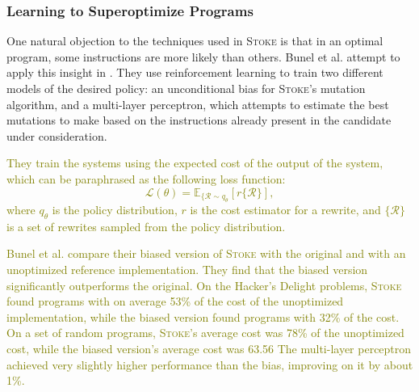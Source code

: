 \documentclass[12pt,twoside]{reedthesis}
\newcommand{\green}[1]{\textcolor{olive}{#1}}
\begin{document}
    \subsubsection{Learning to Superoptimize Programs}
        One natural objection to the techniques used in \textsc{Stoke} is that in an optimal program, some instructions are more likely than others.
        Bunel et al. attempt to apply this insight in \cite{bunel2017learning}.
        They use reinforcement learning to train two different models of the desired policy:
            an unconditional bias for \textsc{Stoke}'s mutation algorithm,
            and a multi-layer perceptron\footnotemark,
                which attempts to estimate the best mutations to make based on the instructions already present in the candidate under consideration.
        
        \green{
        They train the systems using the expected cost of the output of the system, which can be paraphrased as the following loss function:
        \[
            \mathcal{L}(\theta) = \mathbb{E}_{\{\mathcal{R}\sim q_\theta}[r\{\mathcal{R}\}],
        \]
        where $q_\theta$ is the policy distribution, $r$ is the cost estimator for a rewrite, and $\{\mathcal{R}\}$ is a set of rewrites sampled from the policy distribution.
        }
        
        \green{
        Bunel et al. compare their biased version of \textsc{Stoke} with the original and with an unoptimized reference implementation.
        They find that the biased version significantly outperforms the original.
        On the Hacker's Delight problems, \textsc{Stoke} found programs with on average 53\% of the cost of the unoptimized implementation, while the biased version found programs with 32\% of the cost.
        On a set of random programs, \textsc{Stoke}'s average cost was 78\% of the unoptimized cost, while the biased version's average cost was 63.56%
        The multi-layer perceptron achieved very slightly higher performance than the bias, improving on it by about 1\%.
        }
\end{document}

